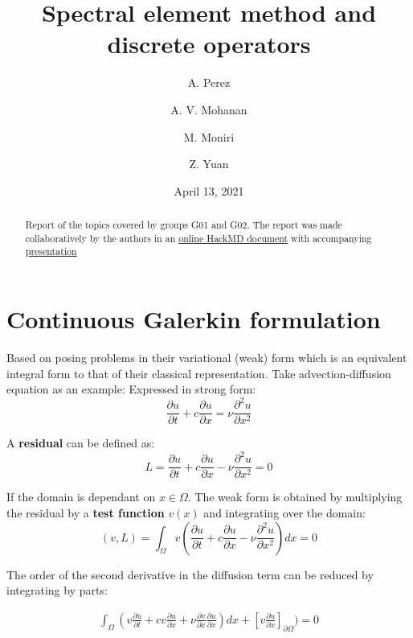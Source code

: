 \documentclass[
]{scrartcl}
\title{Spectral element method and discrete operators}
\author{A. Perez \and A. V. Mohanan \and M. Moniri \and Z. Yuan}
\date{April 13, 2021}
\begin{document}
\maketitle
\begin{abstract}
Report of the topics covered by groups G01 and G02. The report was made
collaboratively by the authors in an
\href{https://hackmd.io/@jmtW1K-nT5O31NGGrCd6Pg/ByZNQkZH_}{online HackMD
document} with accompanying
\href{https://hackmd.io/@ashwinvis/B1PY2JorO}{presentation}
\end{abstract}

{
\hypersetup{linkcolor=}
\setcounter{tocdepth}{3}
\tableofcontents
}
\hypertarget{continuous-galerkin-formulation}{%
\section{Continuous Galerkin
formulation}\label{continuous-galerkin-formulation}}

Based on posing problems in their variational (weak) form which is an
equivalent integral form to that of their classical representation. Take
advection-diffusion equation as an example: Expressed in strong form:
\begin{equation}
\frac{\partial{u}}{\partial{t}} + c \frac{\partial{u}}{\partial{x}} =  \nu \frac{\partial^{2}u}{\partial{x}^{2}}
\end{equation}

A \textbf{residual} can be defined as: \begin{equation}
L=\frac{\partial{u}}{\partial{t}} + c \frac{\partial{u}}{\partial{x}} -  \nu \frac{\partial^{2}u}{\partial{x}^{2}}=0
\end{equation}

If the domain is dependant on \(x \in \Omega\). The weak form is
obtained by multiplying the residual by a \textbf{test function}
\(v(x)\) and integrating over the domain: \begin{equation}
(v,L)=\int_{\Omega} v(\frac{\partial{u}}{\partial{t}} + c \frac{\partial{u}}{\partial{x}} -  \nu \frac{\partial^{2}u}{\partial{x}^{2}})dx=0
\end{equation}

The order of the second derivative in the diffusion term can be reduced
by integrating by parts:

\begin{align}
\int_{\Omega} (v\frac{\partial u}{\partial t} + cv\frac{\partial u}{\partial x} + \nu\frac{\partial v}{\partial x}\frac{\partial u}{\partial x})dx + [v\frac{\partial u}{\partial x}]_{\partial\Omega}) = 0
\end{align}
\end{document}
